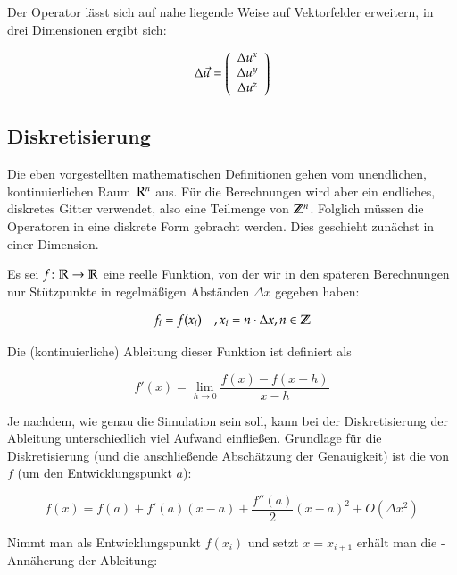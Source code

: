 Der Operator lässt sich auf nahe liegende Weise auf Vektorfelder erweitern, in drei Dimensionen
ergibt sich:

\begin{equation}
\Delta \vec{u} =
\left(
	\begin{array}{c}
		\Delta u^x \\
		\Delta u^y \\
		\Delta u^z
	\end{array}
\right)
\end{equation}

\subsection{Diskretisierung}
\label{sec:mathematics_discretization}

Die eben vorgestellten mathematischen Definitionen gehen vom unendlichen,
kontinuierlichen Raum $\mathbb{R}^n$ aus. Für die Berechnungen wird
aber ein endliches, diskretes Gitter verwendet, also eine Teilmenge von
$\mathbb{Z}^n$. Folglich müssen die Operatoren in eine diskrete Form gebracht
werden. Dies geschieht zunächst in einer Dimension.

Es sei $f \colon \mathbb{R} \to \mathbb{R}$ eine reelle Funktion, von der
wir in den späteren Berechnungen nur Stützpunkte in regelmäßigen Abständen
$\Delta x$ gegeben haben:

\begin{equation}
f_i = f(x_i) \quad , x_i = n \cdot \Delta x, n \in \mathbb{Z}
\end{equation}

Die (kontinuierliche) Ableitung dieser Funktion ist definiert als

\begin{equation}
f'(x) = \lim_{h \to 0} \frac{f(x) - f(x+h)}{x - h}
\end{equation}

Je nachdem, wie genau die Simulation sein soll, kann bei der Diskretisierung der
Ableitung unterschiedlich viel Aufwand einfließen. Grundlage für die
Diskretisierung (und die anschließende Abschätzung der Genauigkeit) ist die
 von $f$ (um den Entwicklungspunkt $a$):

\begin{equation}
f(x) = f(a) + f'(a)(x-a) + \frac{f''(a)}{2}(x-a)^2 + O(\Delta x^2)
\end{equation}

Nimmt man als Entwicklungspunkt $f(x_i)$ und setzt $x=x_{i+1}$ erhält man die
-Annäherung der Ableitung:


